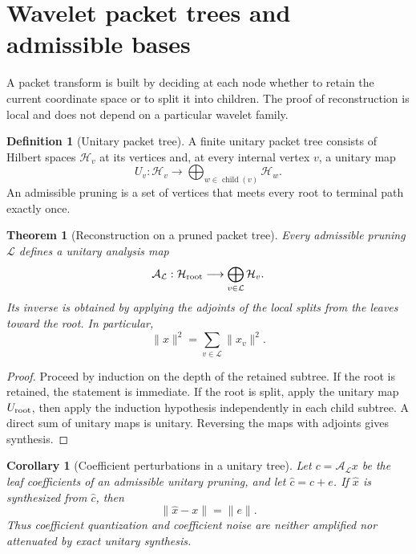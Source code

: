 \documentclass[11pt,letterpaper]{article}
\newtheorem{theorem}{Theorem}[section]
\theoremstyle{plain}
\theoremstyle{plain}
\theoremstyle{plain}
\newtheorem{corollary}[corollary]{Corollary}
\theoremstyle{definition}
\newtheorem{definition}[definition]{Definition}
\theoremstyle{definition}
\theoremstyle{definition}
\theoremstyle{definition}
\theoremstyle{remark}
\theoremstyle{remark}
\theoremstyle{remark}
\theoremstyle{remark}
\newcommand{\Acal}{\mathcal A}
\newcommand{\Hcal}{\mathcal H}
\newcommand{\Lcal}{\mathcal L}
\let\KomorebiPrimitiveWidehat\widehat
\renewcommand{\widehat}[1]{\KomorebiPrimitiveWidehat{#1}}
\begin{document}
\section{Wavelet packet trees and admissible bases}\label{extension:section:06}\label{sec:packet_trees}

A packet transform is built by deciding at each node whether to retain the current coordinate space or to split it into children. The proof of reconstruction is local and does not depend on a particular wavelet family.

\begin{definition}[Unitary packet tree]\label{def:unitary_packet_tree}
A finite unitary packet tree consists of Hilbert spaces \(\Hcal_v\) at its vertices and, at every internal vertex \(v\), a unitary map
\[
U_v:\Hcal_v\longrightarrow\bigoplus_{w\in\operatorname{child}(v)}\Hcal_w.
\]
An admissible pruning is a set of vertices that meets every root to terminal path exactly once.
\end{definition}

\begin{theorem}[Reconstruction on a pruned packet tree]\label{thm:pruned_packet_tree}
Every admissible pruning \(\Lcal\) defines a unitary analysis map
\[
\Acal_{\Lcal}:\Hcal_{\rm root}
\longrightarrow
\bigoplus_{v\in\Lcal}\Hcal_v.
\]
Its inverse is obtained by applying the adjoints of the local splits from the leaves toward the root. In particular,
\[
\|x\|^2
=
\sum_{v\in\Lcal}\|x_v\|^2.
\]
\end{theorem}

\begin{proof}
Proceed by induction on the depth of the retained subtree. If the root is retained, the statement is immediate. If the root is split, apply the unitary map \(U_{\rm root}\), then apply the induction hypothesis independently in each child subtree. A direct sum of unitary maps is unitary. Reversing the maps with adjoints gives synthesis.
\end{proof}

\begin{corollary}[Coefficient perturbations in a unitary tree]\label{cor:unitary_tree_noise}
Let \(c=\Acal_{\Lcal}x\) be the leaf coefficients of an admissible unitary pruning, and let \(\widehat c=c+e\). If \(\widehat x\) is synthesized from \(\widehat c\), then
\[
\|\widehat x-x\|=\|e\|.
\]
Thus coefficient quantization and coefficient noise are neither amplified nor attenuated by exact unitary synthesis.
\end{corollary}
\end{document}
